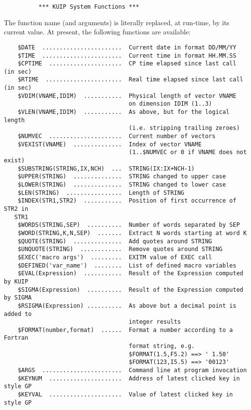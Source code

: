 \begin{verbatim}
          *** KUIP System Functions ***
\end{verbatim}
\ENDVERB
   \par
The function name (and arguments) is literally replaced, at run-time, by 
   its current value.  At present, the following functions are available:  
\begin{verbatim}
    $DATE  .......................  Current date in format DD/MM/YY
    $TIME  .......................  Current time in format HH.MM.SS
    $CPTIME  .....................  CP time elapsed since last call (in sec)
    $RTIME  ......................  Real time elapsed since last call (in sec)
    $VDIM(VNAME,IDIM)  ...........  Physical length of vector VNAME
                                    on dimension IDIM (1..3)
    $VLEN(VNAME,IDIM)  ...........  As above, but for the logical length
                                    (i.e. stripping trailing zeroes)
    $NUMVEC  .....................  Current number of vectors
    $VEXIST(VNAME)  ..............  Index of vector VNAME
                                    (1..$NUMVEC or 0 if VNAME does not exist)
    $SUBSTRING(STRING,IX,NCH)  ...  STRING(IX:IX+NCH-1)
    $UPPER(STRING)  ..............  STRING changed to upper case
    $LOWER(STRING)  ..............  STRING changed to lower case
    $LEN(STRING)  ................  Length of STRING
    $INDEX(STR1,STR2)  ...........  Position of first occurrence of STR2 in 
   STR1
    $WORDS(STRING,SEP)  ..........  Number of words separated by SEP
    $WORD(STRING,K,N,SEP)  .......  Extract N words starting at word K
    $QUOTE(STRING)  ..............  Add quotes around STRING
    $UNQUOTE(STRING)  ............  Remove quotes around STRING
    $EXEC('macro args')  .........  EXITM value of EXEC call
    $DEFINED('var_name')  ........  List of defined macro variables
    $EVAL(Expression)  ...........  Result of the Expression computed by KUIP
    $SIGMA(Expression)  ..........  Result of the Expression computed by SIGMA
    $RSIGMA(Expression) ..........  As above but a decimal point is added to
                                    integer results
    $FORMAT(number,format)  ......  Format a number according to a Fortran
                                    format string, e.g.
                                    $FORMAT(1.5,F5.2) ==> ' 1.50'
                                    $FORMAT(123,I5.5) ==> '00123'
    $ARGS  .......................  Command line at program invocation
    $KEYNUM  .....................  Address of latest clicked key in style GP
    $KEYVAL  .....................  Value of latest clicked key in style GP

\end{verbatim}
